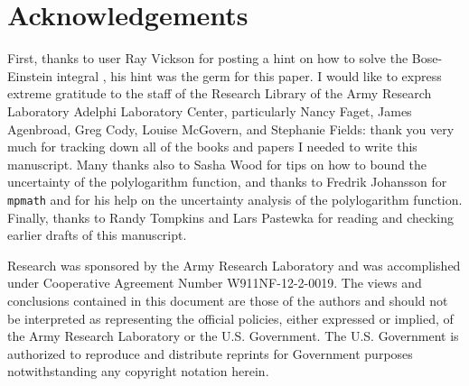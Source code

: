\documentclass[aip,jap,reprint]{revtex4-1}
\begin{document}
\section{Acknowledgements}
First, thanks to user Ray Vickson for posting a hint on how to solve the Bose-Einstein integral \cite{https://www.physicsforums.com/threads/a-bose-einstein-integral.751973}, his hint was the germ for this paper. I would like to express extreme gratitude to the staff of the Research Library of the Army Research Laboratory Adelphi Laboratory Center, particularly Nancy Faget, James Agenbroad, Greg Cody, Louise McGovern, and Stephanie Fields: thank you very much for tracking down all of the books and papers I needed to write this manuscript. Many thanks also to Sasha Wood for tips on how to bound the uncertainty of the polylogarithm function, and thanks to Fredrik Johansson for \texttt{mpmath} and for his help on the uncertainty analysis of the polylogarithm function. Finally, thanks to Randy Tompkins and Lars Pastewka for reading and checking earlier drafts of this manuscript.

Research was sponsored by the Army Research Laboratory and was accomplished under Cooperative Agreement Number W911NF-12-2-0019. The views and conclusions contained in this document are those of the authors and should not be interpreted as representing the official policies, either expressed or implied, of the Army Research Laboratory or the U.S. Government. The U.S. Government is authorized to reproduce and distribute reprints for Government purposes notwithstanding any copyright notation herein.




\end{document}
